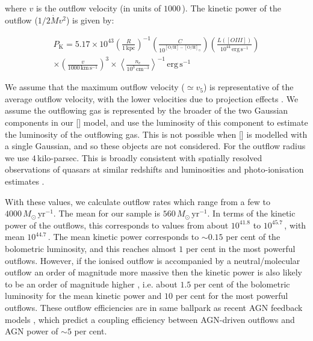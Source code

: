 \noindent where $v$ is the outflow velocity (in units of $1000$\,\kms).
The kinetic power of the outflow ($1/2\dot{M}v^2$) is given by:

\begingroup\makeatletter{}\check@mathfonts
\begin{eqnarray}
P_{\text{K}} = 5.17 \times 10^{43} \left( \frac{R}{1\,\text{kpc}} \right)^{-1} \left( \frac{C}{10^{[\text{O/H}] - [\text{O/H}]_\odot}} \right) \left( \frac{L([OIII])}{10^{44}\, \text{erg}\,\text{s}^{-1}}\right) \nonumber \\ \times \left( \frac{v}{1000\,\text{km}\,\text{s}^{-1}}\right)^3 \times \left\langle \frac{n_e}{10^3\, \text{cm}^{-3}} \right\rangle^{-1} \, \text{erg}\,\text{s}^{-1}
\end{eqnarray}
\endgroup

\noindent We assume that the maximum outflow velocity ($\simeq v_{5}$) is representative of the average outflow velocity, with the lower velocities due to projection effects \citep{cano-diaz12}.
We assume the outflowing gas is represented by the broader of the two Gaussian components in our [] model, and use the luminosity of this component to estimate the luminosity of the outflowing gas.
This is not possible when [] is modelled with a single Gaussian, and so these objects are not considered.
For the outflow radius we use $4$\,kilo-parsec.
This is broadly consistent with spatially resolved observations of quasars at similar redshifts and luminosities \citep[e.g.][]{cano-diaz12,carniani15,brusa16} and photo-ionisation estimates \citep[e.g.][]{zakamska16}.

With these values, we calculate outflow rates which range from a few to $4000\,M_\odot\,\text{yr}^{-1}$.
The mean for our sample is $560\,M_\odot\,\text{yr}^{-1}$.
In terms of the kinetic power of the outflows, this corresponds to values from about $10^{41.8}$ to $10^{45.7}$\,\ergs, with mean $10^{44.7}$\,\ergs.
The mean kinetic power corresponds to $\sim0.15$ per cent of the bolometric luminosity, and this reaches almost $1$ per cent in the most powerful outflows.
However, if the ionised outflow is accompanied by a neutral/molecular outflow an order of magnitude more massive then the kinetic power is also likely to be an order of magnitude higher \citep{cano-diaz12}, i.e. about $1.5$ per cent of the bolometric luminosity for the mean kinetic power and $10$ per cent for the most powerful outflows.
These outflow efficiencies are in same ballpark as recent AGN feedback models \citep[e.g.][]{zubovas12}, which predict a coupling efficiency between AGN-driven outflows and AGN power of $\sim5$ per cent.

